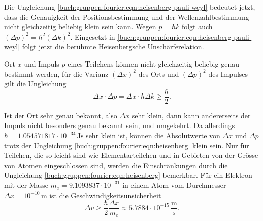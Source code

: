 Die Ungleichung
\eqref{buch:gruppen:fourier:eqn:heisenberg-pauli-weyl}
bedeutet jetzt, dass die Genauigkeit der Positionsbestimmung und der
Wellenzahlbestimmung nicht gleichzeitig beliebig klein sein kann.
Wegen $p=\hbar k$ folgt auch $(\Delta p)^2 = \hbar^2 (\Delta k)^2$.
Eingesetzt in 
\eqref{buch:gruppen:fourier:eqn:heisenberg-pauli-weyl}
folgt jetzt die berühmte Heisenbergsche Unschärferelation.

\begin{satz}[Heisenberg]
\label{buch:gruppen:fourier:satz:heisenberg}
%
%
Ort $x$ und Impuls $p$ eines Teilchens können nicht gleichzeitig beliebig
genau bestimmt werden, für die Varianz $(\Delta x)^2$ des Orts und
$(\Delta p)^2$ des Impulses gilt die Ungleichung
\begin{equation}
\Delta x\cdot \Delta p
=
\Delta x \cdot \hbar \Delta k
\ge 
\frac{\hbar}2.
\label{buch:gruppen:fourier:eqn:heisenberg}
\end{equation}
\end{satz}
Ist der Ort sehr genau bekannt, also $\Delta x$ sehr klein, dann kann 
andererseits der Impuls nicht besonders genau bekannt sein, und umgekehrt.
Da allerdings $\hbar=1.054571817\cdot 10^{-34}\,\text{Js}$ sehr klein 
ist, können die Absolutwerte von $\Delta x$ und $\Delta p$ trotz der 
Ungleichung \eqref{buch:gruppen:fourier:eqn:heisenberg} klein sein.
Nur für Teilchen, die so leicht sind wie Elementarteilchen und 
in Gebieten von der Grösse von Atomen eingeschlossen sind, werden
die Einschränkungen durch die Ungleichung
\eqref{buch:gruppen:fourier:eqn:heisenberg} bemerkbar.
Für ein Elektron mit der Masse $m_e=9.1093837\cdot 10^{-31}$ in einem Atom 
vom Durchmesser $\Delta x=10^{-10}\,\text{m}$ ist die
Geschwindigkeitsunsicherheit
\[
\Delta v 
\ge 
\frac{\hbar}{2} \frac{\Delta x}{m_e}
\approx
5.7884\cdot 10^{-15}\,\frac{\text{m}}{\text{s}}.
\]




